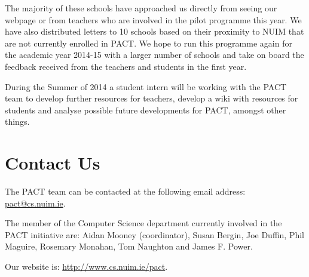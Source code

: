 \documentclass[a4paper]{article}
\begin{document}
The majority of these schools have approached us directly from seeing our webpage or from teachers who are involved in the pilot programme this year. We have also distributed letters to 10 schools based on their proximity to NUIM that are not currently enrolled in PACT. We hope to run this programme again for the academic year 2014-15 with a larger number of schools and take on board the feedback received from the teachers and students in the first year.

During the Summer of 2014 a student intern will be working with the PACT team to develop further resources for teachers, develop a wiki with resources for students and analyse possible future developments for PACT, amongst other things.

\section{Contact Us}
The PACT team can be contacted at the following email address: \url{pact@cs.nuim.ie}.

The member of the Computer Science department currently involved in the PACT initiative are:
Aidan Mooney (coordinator),
Susan Bergin,
Joe Duffin,
Phil Maguire,
Rosemary Monahan,
Tom Naughton and
James F. Power. 




Our website is: \url{http://www.cs.nuim.ie/pact}.



\end{document}
